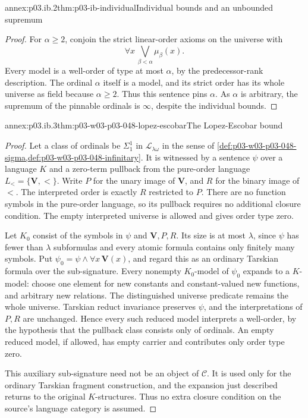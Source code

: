 \begin{annexitem}{annex:p03.ib.2}{thm:p03-ib-individual}{Individual bounds and an unbounded supremum}
\begin{proof}
For \(\alpha\geq2\), conjoin the strict linear-order axioms
on the universe with
\[
 \forall x\,\bigvee_{\beta<\alpha}\mu_\beta(x).
\]
Every model is a well-order of type at most \(\alpha\),
by the predecessor-rank description. The ordinal \(\alpha\)
itself is a model, and its strict order has its whole universe
as field because \(\alpha\geq2\). Thus this sentence pins
\(\alpha\). As \(\alpha\) is arbitrary, the supremum of the
pinnable ordinals is \(\infty\), despite the individual bounds.
\end{proof}
\end{annexitem}

\begin{annexitem}{annex:p03.ib.3}{thm:p03-w03-p03-048-lopez-escobar}{The Lopez-Escobar bound}
\begin{proof}
Let a class of ordinals be \(\Sigma^1_1\) in
\(\mathcal L_{\lambda\omega}\) in the sense of
\cref{def:p03-w03-p03-048-sigma,def:p03-w03-p03-048-infinitary}.
It is witnessed by a sentence \(\psi\) over a language \(K\)
and a zero-term pullback from the pure-order language
\(L_< =\{\mathbf V,<\}\). Write \(P\) for the unary image
of \(\mathbf V\), and \(R\) for the binary image of \(<\).
The interpreted order is exactly \(R\) restricted to \(P\).
There are no function symbols in the pure-order language, so
its pullback requires no additional closure condition. The
empty interpreted universe is allowed and gives order type zero.

Let \(K_0\) consist of the symbols in \(\psi\) and
\(\mathbf V,P,R\). Its size is at most
\(\lambda\), since \(\psi\) has fewer than \(\lambda\)
subformulas and every atomic formula contains only finitely
many symbols. Put
\(\psi_0=\psi\land\forall x\,\mathbf V(x)\), and regard this
as an ordinary Tarskian formula over the sub-signature. Every
nonempty \(K_0\)-model of \(\psi_0\)
expands to a \(K\)-model: choose one element for new constants
and constant-valued new functions, and arbitrary new relations.
The distinguished universe predicate remains the whole universe.
Tarskian reduct invariance preserves \(\psi\), and the
interpretations of \(P,R\) are unchanged. Hence every such
reduced model interprets a well-order, by the hypothesis that
the pullback class consists only of ordinals.
An empty reduced model, if allowed, has empty carrier and
contributes only order type zero.

This auxiliary sub-signature need not be an object of
\(\mathcal C\). It is used only for the ordinary Tarskian
fragment construction, and the expansion just described returns
to the original \(K\)-structures. Thus no extra closure condition
on the source's language category is assumed.


\end{proof}
\end{annexitem}
